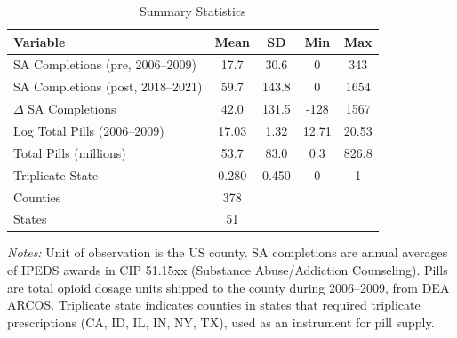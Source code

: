 \begin{table}[htbp]
\centering
\caption{Summary Statistics}
\label{tab:summary}
\begin{threeparttable}
\begin{tabular}{lcccc}
\toprule
Variable & Mean & SD & Min & Max \\
\midrule
SA Completions (pre, 2006--2009) & 17.7 & 30.6 & 0 & 343 \\
SA Completions (post, 2018--2021) & 59.7 & 143.8 & 0 & 1654 \\
$\Delta$ SA Completions & 42.0 & 131.5 & -128 & 1567 \\
Log Total Pills (2006--2009) & 17.03 & 1.32 & 12.71 & 20.53 \\
Total Pills (millions) & 53.7 & 83.0 & 0.3 & 826.8 \\
Triplicate State & 0.280 & 0.450 & 0 & 1 \\
Counties & 378 &  &  &  \\
States & 51 &  &  &  \\
\bottomrule
\end{tabular}
\begin{tablenotes}[flushleft]\small
\item \textit{Notes:} Unit of observation is the US county. SA completions are annual averages of IPEDS awards in CIP 51.15xx (Substance Abuse/Addiction Counseling). Pills are total opioid dosage units shipped to the county during 2006--2009, from DEA ARCOS. Triplicate state indicates counties in states that required triplicate prescriptions (CA, ID, IL, IN, NY, TX), used as an instrument for pill supply.
\end{tablenotes}
\end{threeparttable}
\end{table}

